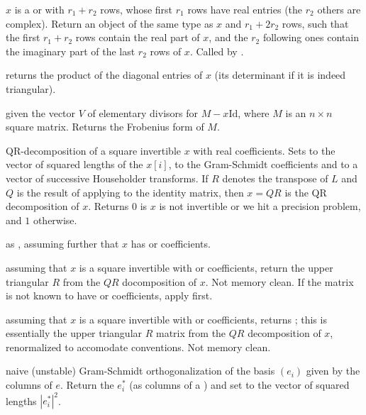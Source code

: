  $x$ is a  or
 with $r_1 + r_2$ rows, whose first $r_1$ rows have real entries
(the $r_2$ others are complex). Return an object of the same type as
$x$ and $r_1 + 2r_2$ rows, such that the first $r_1 + r_2$ rows contain
the real part of $x$, and the $r_2$ following ones contain the imaginary part
of the last $r_2$ rows of $x$. Called by .

 returns the product of the diagonal
entries of $x$ (its determinant if it is indeed triangular).

 given the vector $V$ of elementary
divisors for $M - x\text{Id}$, where $M$ is an $n\times n$ square matrix.
Returns the Frobenius form of $M$.

QR-decomposition of a square invertible  $x$ with real coefficients.
Sets  to the vector of squared lengths of the $x[i]$,  to
the Gram-Schmidt coefficients and  to a vector of successive
Householder transforms. If $R$ denotes the transpose of $L$ and $Q$ is the
result of applying  to the identity matrix, then $x = QR$ is the QR
decomposition of $x$. Returns $0$ is $x$ is not invertible or we hit a
precision problem, and $1$ otherwise.

 as
, assuming further that $x$ has  or 
coefficients.

 assuming that $x$ is a square
invertible  with  or  coefficients, return
the upper triangular $R$ from the $QR$ docomposition of $x$. Not memory
clean. If the matrix is not known to have  or 
coefficients, apply  first.

 assuming that $x$ is a square
invertible  with  or  coefficients, returns
; this is essentially the upper triangular $R$
matrix from the $QR$ decomposition of $x$, renormalized to accomodate
 conventions. Not memory clean.

 naive (unstable) Gram-Schmidt
orthogonalization of the basis $(e_i)$ given by the columns of  $e$.
Return the $e_i^*$ (as columns of a ) and set  to the
vector of squared lengths $|e_i^*|^2$.

